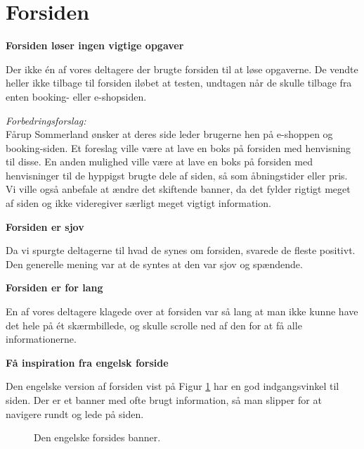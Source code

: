 \documentclass[10pt,a4paper]{article}      %
\newenvironment{forslag}{\emph{Forbedringsforslag:}\\[0.5mm]}{}
\newcommand\pic[1]{\texttt{[image: Pics/\#1]}}
\renewcommand\good{\pic{good}}
\renewcommand\goodidea{\pic{goodidea}}
\renewcommand\smallproblem{\pic{smallproblem}}
\renewcommand\seriousproblem{\pic{seriousproblem}}
\begin{document}
\section{Forsiden}

\begin{kommentarer}
\item[\seriousproblem]{\textbf{Forsiden løser ingen vigtige opgaver}}

Der ikke én af vores deltagere der brugte forsiden til at løse opgaverne. De
vendte heller ikke tilbage til forsiden iløbet at testen, undtagen når de skulle
tilbage fra enten booking- eller e-shopsiden.

\begin{forslag}
Fårup Sommerland ønsker at deres side leder brugerne hen på e-shoppen og booking-siden. Et foreslag ville være at lave en boks på forsiden med henvisning til disse. En anden mulighed ville være at lave en boks på forsiden med henvisninger til de hyppigst brugte dele af siden, så som åbningstider eller pris. Vi ville også anbefale at ændre det skiftende banner, da det fylder rigtigt meget af siden og ikke videregiver særligt meget vigtigt information.
\end{forslag}

\item[\good]{\textbf{Forsiden er sjov}}

Da vi spurgte deltagerne til hvad de synes om forsiden, svarede de fleste
positivt. Den generelle mening var at de syntes at den var sjov og spændende.

\item[\smallproblem]{\textbf{Forsiden er for lang}}

En af vores deltagere klagede over at forsiden var så lang at man ikke kunne
have det hele på ét skærmbillede, og skulle scrolle ned af den for at få alle
informationerne.

\item[\goodidea]{\textbf{Få inspiration fra engelsk forside}}

Den engelske version af forsiden vist på Figur \ref{fig:engelskbanner} har en
god indgangsvinkel til siden. Der er et banner med ofte brugt information, så
man slipper for at navigere rundt og lede på siden.
\end{kommentarer}


\begin{figure}[htbp]
    \centering
    \caption{Den engelske forsides banner.}
    \label{fig:engelskbanner}
\end{figure}
\end{document}
